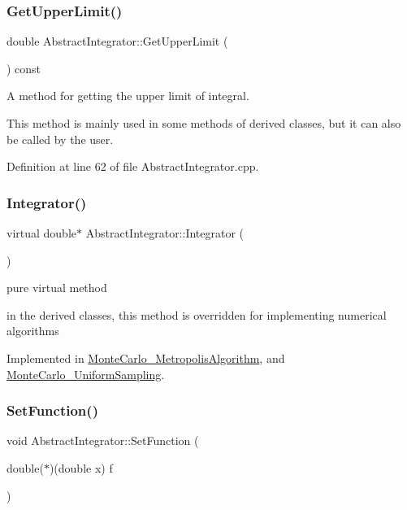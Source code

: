 \subsubsection{\texorpdfstring{Get\+Upper\+Limit()}{GetUpperLimit()}}
{\footnotesize\ttfamily double Abstract\+Integrator\+::\+Get\+Upper\+Limit (\begin{DoxyParamCaption}{ }\end{DoxyParamCaption}) const}



A method for getting the upper limit of integral. 

This method is mainly used in some methods of derived classes, but it can also be called by the user. 

Definition at line 62 of file Abstract\+Integrator.\+cpp.

\mbox{\label{class_abstract_integrator_a073d8f87239f732b3d2832070caa3b17}} 
\subsubsection{\texorpdfstring{Integrator()}{Integrator()}}
{\footnotesize\ttfamily virtual double$\ast$ Abstract\+Integrator\+::\+Integrator (\begin{DoxyParamCaption}{ }\end{DoxyParamCaption})\hspace{0.3cm}{\ttfamily [pure virtual]}}



pure virtual method 

in the derived classes, this method is overridden for implementing numerical algorithms 

Implemented in \hyperlink{class_monte_carlo___metropolis_algorithm_a93fba72a50330bf184156e23158992b2}{Monte\+Carlo\+\_\+\+Metropolis\+Algorithm}, and \hyperlink{class_monte_carlo___uniform_sampling_a1920387a9f817c8179531fa02f7c00d3}{Monte\+Carlo\+\_\+\+Uniform\+Sampling}.

\mbox{\label{class_abstract_integrator_a9350f10f351d5b58c6aa8e581325ff4f}} 
\subsubsection{\texorpdfstring{Set\+Function()}{SetFunction()}}
{\footnotesize\ttfamily void Abstract\+Integrator\+::\+Set\+Function (\begin{DoxyParamCaption}\item[{double($\ast$)(double x)}]{f }\end{DoxyParamCaption})}



